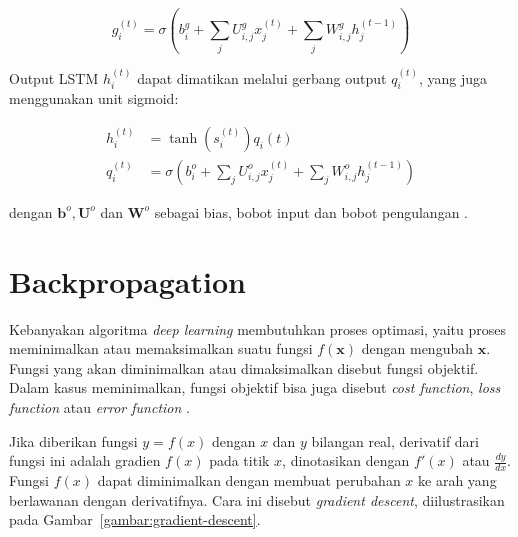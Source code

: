 \begin{equation}
    g_{i}^{(t)} = \sigma\left(b_{i}^{g} + \sum_{j} U_{i,j}^{g} x_{j}^{(t)} + \sum_{j} W_{i,j}^{g} h_{j}^{(t-1)}\right)
\end{equation}

Output LSTM $h_{i}^{(t)}$ dapat dimatikan melalui gerbang output $q_{i}^{(t)}$, yang juga menggunakan unit sigmoid:

\begin{align}
    \label{eq:output-lstm}
    h_{i}^{(t)} &= \tanh\left(s_{i}^{(t)}\right) q_{i}{(t)} \\
    q_{i}^{(t)} &= \sigma\left(b_{i}^{o} + \sum_{j} U_{i,j}^{o} x_{j}^{(t)} + \sum_{j} W_{i,j}^{o} h_{j}^{(t-1)} \right)
\end{align}

\noindent
dengan $\pmb{b}^{o}, \pmb{U}^{o}$ dan $\pmb{W}^{o}$ sebagai bias, bobot input dan bobot pengulangan \citep{goodfellow-2016}.


\section{Backpropagation}
Kebanyakan algoritma \textit{deep learning} membutuhkan proses optimasi, yaitu proses meminimalkan atau memaksimalkan suatu fungsi $f(\pmb{x})$ dengan mengubah $\pmb{x}$. Fungsi yang akan diminimalkan atau dimaksimalkan disebut fungsi objektif. Dalam kasus meminimalkan, fungsi objektif bisa juga disebut \textit{cost function}, \textit{loss function} atau \textit{error function} \citep{goodfellow-2016}.

Jika diberikan fungsi $y = f(x)$ dengan $x$ dan $y$ bilangan real, derivatif dari fungsi ini adalah gradien $f(x)$ pada titik $x$, dinotasikan dengan $f'(x)$ atau $\frac{dy}{dx}$. Fungsi $f(x)$ dapat diminimalkan dengan membuat perubahan $x$ ke arah yang berlawanan dengan derivatifnya. Cara ini disebut \textit{gradient descent}, diilustrasikan pada Gambar~\ref{gambar:gradient-descent}.

